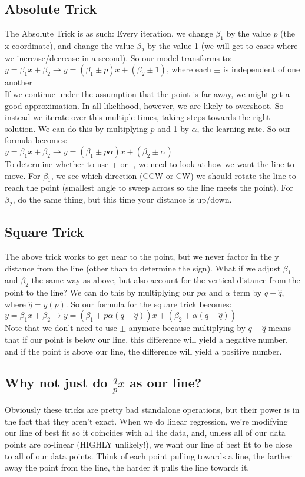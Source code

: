 \documentclass{article}
\begin{document}
\subsection{Absolute Trick}
The Absolute Trick is as such: Every iteration, we change $\beta_1$ by the value $p$ (the x coordinate), and change the value $\beta_2$ by the value 1 (we will get to cases where we increase/decrease in a second). So our model transforms to:\\
$y = \beta_1x+\beta_2 \rightarrow y = (\beta_1 \pm p)x+(\beta_2 \pm 1)$, where each $\pm$ is independent of one another\\
If we continue under the assumption that the point is far away, we might get a good approximation. In all likelihood, however, we are likely to overshoot. So instead we iterate over this multiple times, taking steps towards the right solution. We can do this by multiplying $p$ and 1 by $\alpha$, the learning rate. So our formula becomes:\\
$y = \beta_1x+\beta_2 \rightarrow y = (\beta_1 \pm p\alpha)x+(\beta_2 \pm \alpha)$\\
To determine whether to use + or -, we need to look at how we want the line to move. For $\beta_1$, we see which direction (CCW or CW) we should rotate the line to reach the point (smallest angle to sweep across so the line meets the point). For $\beta_2$, do the same thing, but this time your distance is up/down.
\subsection{Square Trick}
The above trick works to get near to the point, but we never factor in the y distance from the line (other than to determine the sign). What if we adjust $\beta_1$ and $\beta_2$ the same way as above, but also account for the vertical distance from the point to the line? We can do this by multiplying our $p\alpha$ and $\alpha$ term by $q-\hat{q}$, where $\hat{q} = y(p)$. So our formula for the square trick becomes:\\
$y = \beta_1x+\beta_2 \rightarrow y = (\beta_1 + p\alpha(q-\hat{q}))x+(\beta_2 + \alpha(q-\hat{q}))$\\
Note that we don't need to use $\pm$ anymore because multiplying by $q-\hat{q}$ means that if our point is below our line, this difference will yield a negative number,  and if the point is above our line, the difference will yield a positive number.
\subsection{Why not just do $\frac{q}{p}x$ as our line?}
Obviously these tricks are pretty bad standalone operations, but their power is in the fact that they aren't exact. When we do linear regression, we're modifying our line of best fit so it coincides with all the data, and, unless all of our data points are co-linear (HIGHLY unlikely!), we want our line of best fit to be close to all of our data points. Think of each point pulling towards a line, the farther away the point from the line, the harder it pulls the line towards it.
\end{document}
